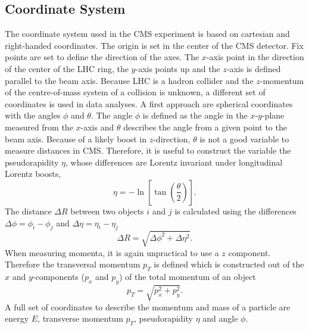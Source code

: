 \subsection{Coordinate System}
\label{sec:coordinate}
	The coordinate system used in the CMS experiment is based on cartesian and right-handed coordinates. The origin is set in the center of the CMS detector. Fix points are set to define the direction of the axes. The $x$-axis point in the direction of the center of the LHC ring, the $y$-axis points up and the $z$-axis is defined parallel to the beam axis. Because LHC is a hadron collider and the $z$-momentum of the centre-of-mass system of a collision is unknown, a different set of coordinates is used in data analyses. A first approach are spherical coordinates with the angles $\phi$ and $\theta$. The angle $\phi$ is defined as the angle in the $x$-$y$-plane measured from the $x$-axis and $\theta$ describes the angle from a given point to the beam axis. Because of a likely boost in $z$-direction, $\theta$ is not a good variable to measure distances in CMS. Therefore, it is useful to construct the variable the pseudorapidity $\eta$, whose differences are Lorentz invariant under longitudinal Lorentz boosts,
	\begin{equation}
	\eta = - \ln \left[\tan\left( \frac{\theta}{2}\right) \right].
	\end{equation} 
	The distance $\Delta R$ between two objects $i$ and $j$ is calculated using the differences $\Delta \phi = \phi_i - \phi_j$ and $\Delta \eta = \eta_i - \eta_j$
	\begin{equation}
	\Delta R = \sqrt{\Delta \phi ^2 + \Delta \eta ^2} .
	\end{equation}
	When measuring momenta, it is again unpractical to use a $z$ component. Therefore the transversal momentum $p_T$ is defined which is constructed out of the $x$ and $y$-components ($p_x$ and $p_y$) of the total momentum of an object
	\begin{equation}
	p_T = \sqrt{p_x^2 + p_y^2} .
	\end{equation} 
	A full set of coordinates to describe the momentum and mass of a particle are energy $E$, transverse momentum $p_T$, pseudorapidity $\eta$ and angle $\phi$.
	
